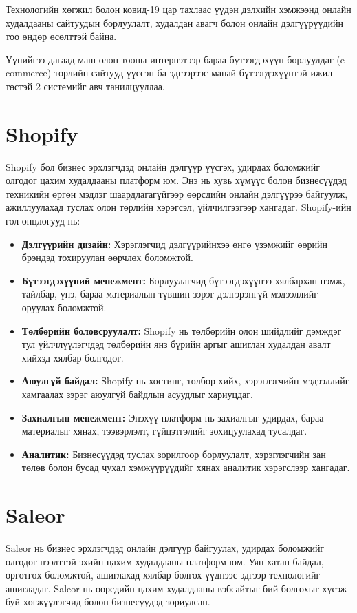 Технологийн хөгжил болон ковид-19 цар тахлаас үүдэн дэлхийн хэмжээнд онлайн худалдааны сайтуудын борлуулалт, худалдан авагч болон онлайн дэлгүүрүүдийн тоо өндөр өсөлттэй байна.

Үүнийгээ дагаад маш олон тооны интернэтээр бараа бүтээгдэхүүн борлуулдаг (e-commerce) төрлийн сайтууд үүссэн ба эдгээрээс манай бүтээгдэхүүнтэй ижил төстэй 2 системийг авч танилцууллаа.

\section{Shopify}
Shopify бол бизнес эрхлэгчдэд онлайн дэлгүүр үүсгэх, удирдах боломжийг олгодог цахим худалдааны платформ юм. Энэ нь хувь хүмүүс болон бизнесүүдэд техникийн өргөн мэдлэг шаардлагагүйгээр өөрсдийн онлайн дэлгүүрээ байгуулж, ажиллуулахад туслах олон төрлийн хэрэгсэл, үйлчилгээгээр хангадаг. Shopify-ийн гол онцлогууд нь:
\begin{itemize}
   \item \textbf{Дэлгүүрийн дизайн:} Хэрэглэгчид дэлгүүрийнхээ өнгө үзэмжийг өөрийн брэндэд тохируулан өөрчлөх боломжтой.

   \item  \textbf{Бүтээгдэхүүний менежмент:} Борлуулагчид бүтээгдэхүүнээ хялбархан нэмж, тайлбар, үнэ, бараа материалын түвшин зэрэг дэлгэрэнгүй мэдээллийг оруулах боломжтой.

   \item  \textbf{Төлбөрийн боловсруулалт:} Shopify нь төлбөрийн олон шийдлийг дэмждэг тул үйлчлүүлэгчдэд төлбөрийн янз бүрийн аргыг ашиглан худалдан авалт хийхэд хялбар болгодог.

   \item  \textbf{Аюулгүй байдал:} Shopify нь хостинг, төлбөр хийх, хэрэглэгчийн мэдээллийг хамгаалах зэрэг аюулгүй байдлын асуудлыг хариуцдаг.

   \item \textbf{Захиалгын менежмент:} Энэхүү платформ нь захиалгыг удирдах, бараа материалыг хянах, тээвэрлэлт, гүйцэтгэлийг зохицуулахад тусалдаг.

   \item \textbf{Аналитик:} Бизнесүүдэд туслах зорилгоор борлуулалт, хэрэглэгчийн зан төлөв болон бусад чухал хэмжүүрүүдийг хянах аналитик хэрэгслээр хангадаг.
\end{itemize}


\section{Saleor}
Saleor нь бизнес эрхлэгчдэд онлайн дэлгүүр байгуулах, удирдах боломжийг олгодог нээлттэй эхийн цахим худалдааны платформ юм. Уян хатан байдал, өргөтгөх боломжтой, ашиглахад хялбар болгох үүднээс эдгээр технологийг ашигладаг. Saleor нь өөрсдийн цахим худалдааны вэбсайтыг бий болгохыг хүсэж буй хөгжүүлэгчид болон бизнесүүдэд зориулсан.


